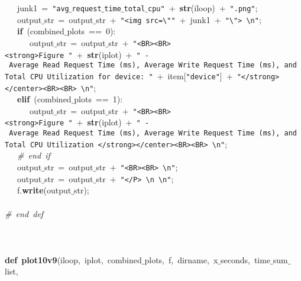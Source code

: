\mbox{}\ \ \ junk1\ =\ \texttt{"{}avg$\_$request$\_$time$\_$total$\_$cpu"{}}\ +\ \textbf{str}(iloop)\ +\ \texttt{"{}.png"{}}; \\
\mbox{}\ \ \ output$\_$str\ =\ output$\_$str\ +\ \texttt{"{}\textless{}img\ src=\textbackslash{}"{}"{}}\ +\ junk1\ +\ \texttt{"{}\textbackslash{}"{}\textgreater{}\ \textbackslash{}n"{}}; \\
\mbox{}\ \ \ \textbf{if}\ (combined$\_$plots\ ==\ 0): \\
\mbox{}\ \ \ \ \ \ output$\_$str\ =\ output$\_$str\ +\ \texttt{"{}\textless{}BR\textgreater{}\textless{}BR\textgreater{}\textless{}strong\textgreater{}Figure\ "{}}\ +\ \textbf{str}(iplot)\ +\ \texttt{"{}\ -\ Average\ Read\ Request\ Time\ (ms),\ Average\ Write\ Request\ Time\ (ms),\ and\ Total\ CPU\ Utilization\ for\ device:\ "{}}\ +\ item[\texttt{"{}device"{}}]\ +\ \texttt{"{}\textless{}/strong\textgreater{}\textless{}/center\textgreater{}\textless{}BR\textgreater{}\textless{}BR\textgreater{}\ \textbackslash{}n"{}}; \\
\mbox{}\ \ \ \textbf{elif}\ (combined$\_$plots\ ==\ 1): \\
\mbox{}\ \ \ \ \ \ output$\_$str\ =\ output$\_$str\ +\ \texttt{"{}\textless{}BR\textgreater{}\textless{}BR\textgreater{}\textless{}strong\textgreater{}Figure\ "{}}\ +\ \textbf{str}(iplot)\ +\ \texttt{"{}\ -\ Average\ Read\ Request\ Time\ (ms),\ Average\ Write\ Request\ Time\ (ms),\ and\ Total\ CPU\ Utilization\ \textless{}/strong\textgreater{}\textless{}/center\textgreater{}\textless{}BR\textgreater{}\textless{}BR\textgreater{}\ \textbackslash{}n"{}}; \\
\mbox{}\ \ \ \textit{\#\ end\ if} \\
\mbox{}\ \ \ output$\_$str\ =\ output$\_$str\ +\ \texttt{"{}\textless{}BR\textgreater{}\textless{}BR\textgreater{}\ \textbackslash{}n"{}}; \\
\mbox{}\ \ \ output$\_$str\ =\ output$\_$str\ +\ \texttt{"{}\textless{}/P\textgreater{}\ \textbackslash{}n\ \textbackslash{}n"{}}; \\
\mbox{}\ \ \ f.\textbf{write}(output$\_$str); \\
\mbox{}\ \ \  \\
\mbox{}\textit{\#\ end\ def} \\
\mbox{} \\
\mbox{} \\
\mbox{} \\
\mbox{}\textbf{def}\ \textbf{plot10v9}(iloop,\ iplot,\ combined$\_$plots,\ f,\ dirname,\ x$\_$seconds,\ time$\_$sum$\_$list, \\
